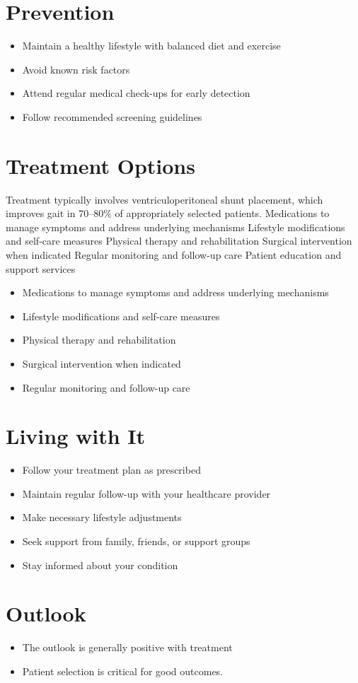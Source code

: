 \section{Prevention}
\begin{itemize}[noitemsep]
  \item Maintain a healthy lifestyle with balanced diet and exercise
  \item Avoid known risk factors
  \item Attend regular medical check-ups for early detection
  \item Follow recommended screening guidelines
\end{itemize}
\section{Treatment Options}
Treatment typically involves ventriculoperitoneal shunt placement, which improves gait in 70--80\% of appropriately selected patients. Medications to manage symptoms and address underlying mechanisms Lifestyle modifications and self-care measures Physical therapy and rehabilitation Surgical intervention when indicated Regular monitoring and follow-up care Patient education and support services

\begin{itemize}[noitemsep]
  \item Medications to manage symptoms and address underlying mechanisms
  \item Lifestyle modifications and self-care measures
  \item Physical therapy and rehabilitation
  \item Surgical intervention when indicated
  \item Regular monitoring and follow-up care
\end{itemize}
\section{Living with It}
\begin{itemize}[noitemsep]
  \item Follow your treatment plan as prescribed
  \item Maintain regular follow-up with your healthcare provider
  \item Make necessary lifestyle adjustments
  \item Seek support from family, friends, or support groups
  \item Stay informed about your condition
\end{itemize}
\section{Outlook}
\begin{itemize}[noitemsep]
  \item The outlook is generally positive with treatment
  \item Patient selection is critical for good outcomes.
\end{itemize}
